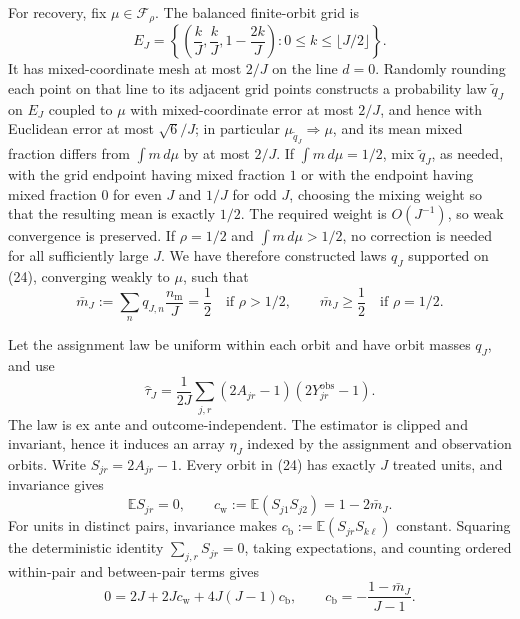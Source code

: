 For recovery, fix \(\mu\in\mathcal F_\rho\).  The balanced finite-orbit grid is
\[
 E_J=\left\{
 \left(\frac kJ,\frac kJ,1-\frac{2k}J\right):
 0\le k\le\lfloor J/2\rfloor
 \right\}.
 \tag{24}
\]
It has mixed-coordinate mesh at most \(2/J\) on the line \(d=0\).  Randomly rounding each point on that line to its adjacent grid points constructs a probability law \(\widetilde q_J\) on \(E_J\) coupled to \(\mu\) with mixed-coordinate error at most \(2/J\), and hence with Euclidean error at most \(\sqrt6/J\); in particular \(\mu_{\widetilde q_J}\Rightarrow\mu\), and its mean mixed fraction differs from \(\int m\,d\mu\) by at most \(2/J\).  If \(\int m\,d\mu=1/2\), mix \(\widetilde q_J\), as needed, with the grid endpoint having mixed fraction \(1\) or with the endpoint having mixed fraction \(0\) for even \(J\) and \(1/J\) for odd \(J\), choosing the mixing weight so that the resulting mean is exactly \(1/2\).  The required weight is \(O(J^{-1})\), so weak convergence is preserved.  If \(\rho=1/2\) and \(\int m\,d\mu>1/2\), no correction is needed for all sufficiently large \(J\).  We have therefore constructed laws \(q_J\) supported on (24), converging weakly to \(\mu\), such that
\[
 \bar m_J:=\sum_nq_{J,n}\frac{n_{\mathrm m}}J
 =\frac12\quad\text{if }\rho>1/2,
 \qquad
 \bar m_J\ge\frac12\quad\text{if }\rho=1/2.
 \tag{25}
\]

Let the assignment law be uniform within each orbit and have orbit masses \(q_J\), and use
\[
 \widehat\tau_J
 =\frac1{2J}\sum_{j,r}(2A_{jr}-1)(2Y^{\mathrm{obs}}_{jr}-1).
 \tag{26}
\]
The law is ex ante and outcome-independent.  The estimator is clipped and invariant, hence it induces an array \(\eta_J\) indexed by the assignment and observation orbits.  Write \(S_{jr}=2A_{jr}-1\).  Every orbit in (24) has exactly \(J\) treated units, and invariance gives
\[
 \mathbb E S_{jr}=0,
 \qquad
 c_{\mathrm w}:=\mathbb E(S_{j1}S_{j2})=1-2\bar m_J.
 \tag{27}
\]
For units in distinct pairs, invariance makes \(c_{\mathrm b}:=\mathbb E(S_{jr}S_{k\ell})\) constant.  Squaring the deterministic identity \(\sum_{j,r}S_{jr}=0\), taking expectations, and counting ordered within-pair and between-pair terms gives
\[
 0=2J+2Jc_{\mathrm w}+4J(J-1)c_{\mathrm b},
 \qquad
 c_{\mathrm b}=-\frac{1-\bar m_J}{J-1}.
 \tag{28}
\]

